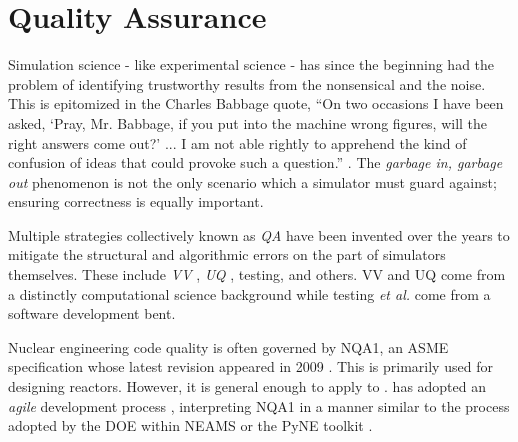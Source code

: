 \section{Quality Assurance}
%

%


Simulation science - like experimental science - has since the beginning had the 
problem of identifying trustworthy results from the nonsensical and the noise.
This is epitomized in the Charles Babbage quote, ``On two occasions I have been asked, 
`Pray, Mr. Babbage, if you put into the machine wrong figures, will the right 
answers come out?' ... I am not able rightly to apprehend the kind of confusion 
of ideas that could provoke such a question.'' \cite{babbage_passages_2011}. 
The \emph{garbage in, garbage out} phenomenon is not the only scenario which a
simulator must guard against; ensuring correctness is equally important.

Multiple strategies collectively known as \emph{\gls{QA}} have 
been invented over the years to mitigate the structural and algorithmic errors
on the part of simulators themselves. These include \emph{\gls{VV}}
\cite{boehm_software_1989}, \emph{\gls{UQ}} 
\cite{sacks_design_1989}, testing, and others. \gls{VV} and \gls{UQ} come from 
a distinctly computational science background while testing \emph{et al.} come from 
a software development bent. 

Nuclear engineering code quality is often governed by \gls{NQA1}, an 
\gls{ASME} specification 
whose latest revision appeared in 2009 \cite{asme_nqa-1a-2009_2009}. This is primarily 
used for designing reactors. However, it is general enough to apply to 
\Cyclus. \Cyclus has adopted an \emph{agile} development process 
\cite{larman_agile_2004}, 
interpreting \gls{NQA1} in a manner similar to the process adopted by the 
\gls{DOE} within \gls{NEAMS} \cite{neams_nuclear_2013} or the 
PyNE toolkit \cite{biondo_quality_2014}. 

